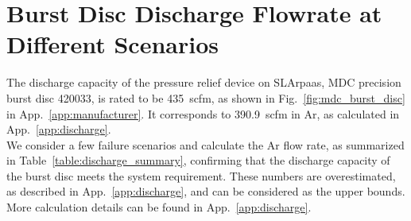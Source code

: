 \section{Burst Disc Discharge Flowrate at Different Scenarios}
\label{sec:discharge_rate}

The discharge capacity of the pressure relief device on SLArpaas,
MDC precision burst disc 420033, is rated to be 435~scfm,
as shown in Fig.~\ref{fig:mdc_burst_disc} in App.~\ref{app:manufacturer}.
It corresponds to 390.9~scfm in Ar, as calculated in App.~\ref{app:discharge}.\\

We consider a few failure scenarios and calculate the Ar flow rate,
as summarized in Table~\ref{table:discharge_summary},
confirming that the discharge capacity of the burst disc meets the
system requirement.
These numbers are overestimated, as described in App.~\ref{app:discharge},
and can be considered as the upper bounds.
More calculation details can be found in App.~\ref{app:discharge}.

